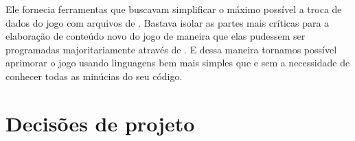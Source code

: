
    Ele fornecia ferramentas que buscavam simplificar o máximo possível a
    troca de dados do jogo com arquivos de \script{}. Bastava isolar as
    partes mais críticas para a elaboração de conteúdo novo do jogo de maneira
    que elas pudessem ser programadas majoritariamente através de . E
    dessa maneira tornamos possível aprimorar o jogo usando linguagens bem mais
    simples que \CXX{} e sem a necessidade de conhecer todas as minúcias do seu
    código.


  

  \section{Decisões de projeto}
  \label{sec:actividads:decisoes}
  
